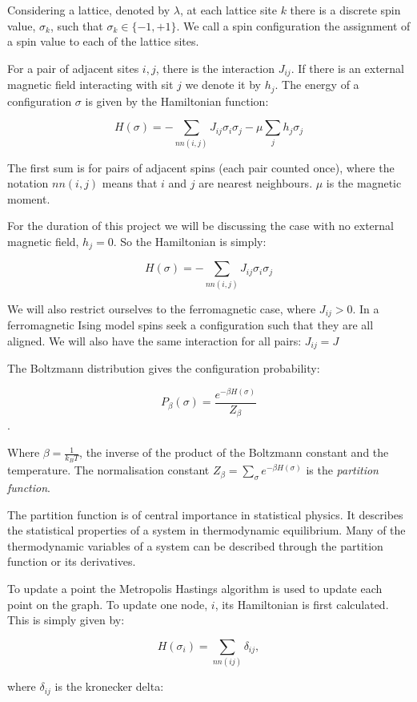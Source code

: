 \documentclass[pdftex,12pt,a4paper]{article}
\begin{document}
Considering a lattice, denoted by $\lambda$, at each lattice site $k$ there is a discrete spin value, $\sigma_k$, such that $\sigma_k \in \{-1,+1\}$. We call a spin configuration the assignment of a spin value to each of the lattice sites.

For a pair of adjacent sites $i,j$, there is the interaction $J_{ij}$. If there is an external magnetic field interacting with sit $j$ we denote it by $h_j$. The energy of a configuration $\sigma$ is given by the Hamiltonian function:

\[ H(\sigma) = - \sum_{nn(i,j)} J_{ij} \sigma_i \sigma_j - \mu \sum_{j} h_j \sigma_j \]

The first sum is for pairs of adjacent spins (each pair counted once), where the notation $nn(i,j)$ means that $i$ and $j$ are nearest neighbours. $\mu$ is the magnetic moment.

For the duration of this project we will be discussing the case with no external magnetic field, $h_j = 0$. So the Hamiltonian is simply:

\[ H(\sigma) = - \sum_{nn(i,j)} J_{ij} \sigma_i \sigma_j  \]

We will also restrict ourselves to the ferromagnetic case, where $J_{ij} > 0$. In a ferromagnetic Ising model spins seek a configuration such that they are all aligned. We will also have the same interaction for all pairs: $J_{ij} = J$

The Boltzmann distribution gives the configuration probability:

\[ P_{\beta}(\sigma) = \frac{e^{-\beta H(\sigma)}}{Z_{\beta}} \].

Where $\beta = \frac{1}{k_B T}$, the inverse of the product of the Boltzmann constant and the temperature. The normalisation constant $Z_{\beta} = \sum_{\sigma} e^{-\beta H(\sigma)}$ is the \emph{partition function}.

The partition function is of central importance in statistical physics. It describes the statistical properties of a system in thermodynamic equilibrium. Many of the thermodynamic variables of a system can be described through the partition function or its derivatives.

To update a point the Metropolis Hastings algorithm is used to update each point on the graph. To update one node, $i$, its Hamiltonian is first calculated. This is simply given by:

\[ H(\sigma_i) = \sum_{nn(ij)} \delta_{ij}, \]

where $\delta_{ij}$ is the kronecker delta: 
\end{document}
